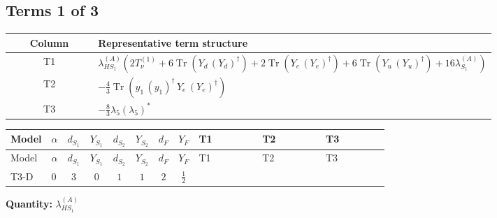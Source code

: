 \documentclass[8pt]{article}
\begin{document}
\begin{landscape}
\subsection*{Terms 1 of 3}
\begin{center}
\begin{tabular}{@{}c >{\raggedright\arraybackslash}p{0.82\linewidth}@{}}
\toprule
Column & Representative term structure \\
\midrule
T1 & \(\displaystyle {\lambda_{HS_1}^{(A)}} (2 T_{\nu}^{(1)}+6 \operatorname{Tr}\!\left({Y_d}\,\left({Y_d}\right)^{\dagger}\right)+2 \operatorname{Tr}\!\left({Y_e}\,\left({Y_e}\right)^{\dagger}\right)+6 \operatorname{Tr}\!\left({Y_u}\,\left({Y_u}\right)^{\dagger}\right)+16 {\lambda_{S_1}^{(A)}})\) \\
\midrule
T2 & \(\displaystyle -\frac{4}{3} \operatorname{Tr}\!\left({y_1}\,\left({y_1}\right)^{\dagger}\,{Y_e}\,\left({Y_e}\right)^{\dagger}\right)\) \\
\midrule
T3 & \(\displaystyle -\frac{8}{3} {\lambda_5} \left({\lambda_5}\right)^{*}\) \\
\midrule
\bottomrule
\end{tabular}
\end{center}
\smallskip
\tiny
\begin{longtable}{@{}llcccccc >{\raggedright\arraybackslash}p{0.21\linewidth} >{\raggedright\arraybackslash}p{0.21\linewidth} >{\raggedright\arraybackslash}p{0.21\linewidth}@{}}
\toprule
Model & $\alpha$ & $d_{S_1}$ & $Y_{S_1}$ & $d_{S_2}$ & $Y_{S_2}$ & $d_F$ & $Y_F$ & T1 & T2 & T3 \\
\midrule
\endfirsthead
\toprule
Model & $\alpha$ & $d_{S_1}$ & $Y_{S_1}$ & $d_{S_2}$ & $Y_{S_2}$ & $d_F$ & $Y_F$ & T1 & T2 & T3 \\
\midrule
\endhead
T3-D & $0$ & $3$ & $0$ & $1$ & $1$ & $2$ & $\frac{1}{2}$ & \scriptsize\adjustbox{max width=\linewidth}{$\begin{gathered} {\lambda_{HS_1}^{(A)}} (2 T_{\nu}^{(1)}+6 \operatorname{Tr}\!\left({Y_d}\,\left({Y_d}\right)^{\dagger}\right)+2 \operatorname{Tr}\!\left({Y_e}\,\left({Y_e}\right)^{\dagger}\right)+6 \operatorname{Tr}\!\left({Y_u}\,\left({Y_u}\right)^{\dagger}\right)+16 {\lambda_{S_1}^{(A)}})\end{gathered}$} & \scriptsize\adjustbox{max width=\linewidth}{$\begin{gathered} -\frac{4}{3} \operatorname{Tr}\!\left({y_1}\,\left({y_1}\right)^{\dagger}\,{Y_e}\,\left({Y_e}\right)^{\dagger}\right)\end{gathered}$} & \scriptsize\adjustbox{max width=\linewidth}{$\begin{gathered} -\frac{8}{3} {\lambda_5} \left({\lambda_5}\right)^{*}\end{gathered}$} \\
\midrule
\bottomrule
\end{longtable}
\clearpage
\noindent\textbf{Quantity: }$\lambda_{HS_1}^{(A)}$\par\smallskip

\end{landscape}
\end{document}
